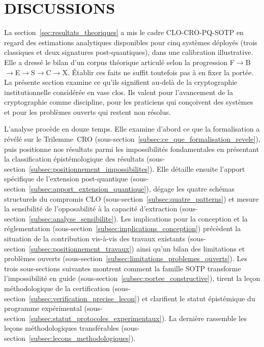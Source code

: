 
\section{DISCUSSIONS}
\label{sec:discussions}
\begin{sloppypar}
La
section~\ref{sec:resultats_theoriques} a mis le cadre CLO-CRO-PQ-SOTP en
regard des estimations analytiques disponibles pour cinq syst\`emes d\'eploy\'es
(trois classiques et deux signatures post-quantiques), dans une calibration
illustrative. Elle a dress\'e le bilan d'un corpus th\'eorique articul\'e selon la
progression F$\to$B$\to$E$\to$S$\to$C$\to$X.
\'Etablir ces faits ne suffit toutefois pas \`a en fixer la port\'ee. La pr\'esente section
examine ce qu'ils signifient au-del\`a de la cryptographie institutionnelle consid\'er\'ee en vase
clos. Ils valent pour l'avancement de la cryptographie comme discipline, pour les
praticiens qui con\c{c}oivent des syst\`emes et pour les probl\`emes ouverts
qui restent non r\'esolus.

L'analyse proc\`ede en douze temps. Elle examine d'abord ce que la
formalisation a r\'ev\'el\'e sur le Trilemme~CRO
(sous-section~\ref{subsec:ce_que_formalisation_revele}), puis positionne nos
r\'esultats parmi les impossibilit\'es fondamentales en pr\'esentant la
classification \'epist\'emologique des r\'esultats
(sous-section~\ref{subsec:positionnement_impossibilites}). Elle d\'etaille ensuite l'apport
sp\'ecifique de l'extension post-quantique
(sous-section~\ref{subsec:apport_extension_quantique}), d\'egage les quatre sch\'emas
structurels du compromis CLO (sous-section~\ref{subsec:quatre_patterns}) et mesure la sensibilit\'e de
l'opposabilit\'e \`a la capacit\'e d'extraction
(sous-section~\ref{subsec:analyse_sensibilite}). Les implications pour
la conception et la r\'eglementation (sous-section~\ref{subsec:implications_conception})
pr\'ec\`edent la situation de la contribution
vis-\`a-vis des travaux existants (sous-section~\ref{subsec:positionnement_travaux}) ainsi qu'un bilan
des limitations et probl\`emes ouverts
(sous-section~\ref{subsec:limitations_problemes_ouverts}). Les trois sous-sections suivantes montrent comment la
famille SOTP transforme l'impossibilit\'e en guide
(sous-section~\ref{subsec:portee_constructive}), tirent la le\c{c}on
m\'ethodologique de la certification
(sous-section~\ref{subsec:verification_precise_lecon}) et clarifient le
statut \'epist\'emique du programme exp\'erimental
(sous-section~\ref{subsec:statut_protocoles_experimentaux}). La derni\`ere rassemble les
le\c{c}ons m\'ethodologiques transf\'erables (sous-section~\ref{subsec:lecons_methodologiques}).
\end{sloppypar}

